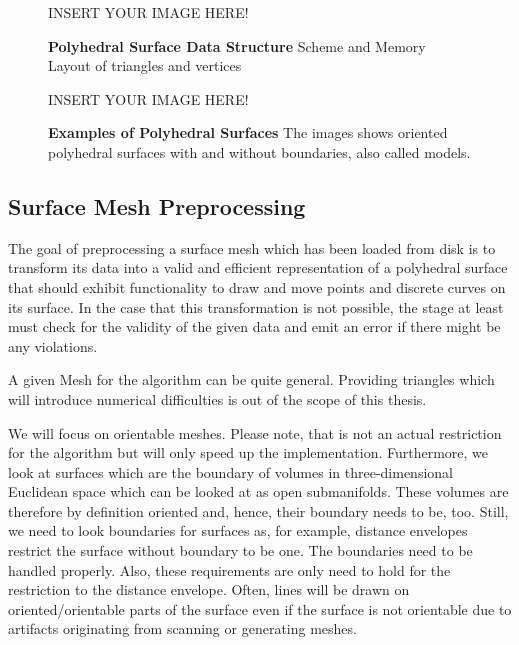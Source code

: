 \documentclass{stdlocal}
\begin{document}
  \begin{figure}[h]
    \begin{center}
      \large
      INSERT YOUR IMAGE HERE!
    \end{center}
    \caption[Polyhedral Surface Data Structure]{%
      \textbf{Polyhedral Surface Data Structure}
      Scheme and Memory Layout of triangles and vertices
    }
  \end{figure}

  \begin{figure}
    \begin{center}
      \large
      INSERT YOUR IMAGE HERE!
    \end{center}
    \caption[Examples of Polyhedral Surfaces]{%
      \textbf{Examples of Polyhedral Surfaces}
      The images shows oriented polyhedral surfaces with and without boundaries, also called models.
    }
  \end{figure}

\subsection{Surface Mesh Preprocessing} %
\label{sub:mesh_preprocessing}
  The goal of preprocessing a surface mesh which has been loaded from disk is to transform its data into a valid and efficient representation of a polyhedral surface that should exhibit functionality to draw and move points and discrete curves on its surface.
  In the case that this transformation is not possible, the stage at least must check for the validity of the given data and emit an error if there might be any violations.

  A given Mesh for the algorithm can be quite general.
  Providing triangles which will introduce numerical difficulties is out of the scope of this thesis.

  We will focus on orientable meshes.
  Please note, that is not an actual restriction for the algorithm but will only speed up the implementation.
  Furthermore, we look at surfaces which are the boundary of volumes in three-dimensional Euclidean space which can be looked at as open submanifolds.
  These volumes are therefore by definition oriented and, hence, their boundary needs to be, too.
  Still, we need to look boundaries for surfaces as, for example, distance envelopes restrict the surface without boundary to be one.
  The boundaries need to be handled properly.
  Also, these requirements are only need to hold for the restriction to the distance envelope.
  Often, lines will be drawn on oriented/orientable parts of the surface even if the surface is not orientable due to artifacts originating from scanning or generating meshes.
\end{document}
